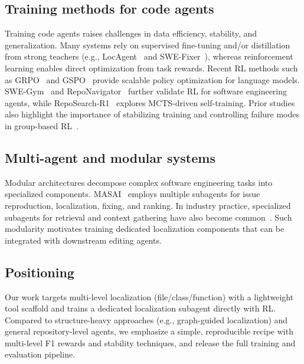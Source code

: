 \subsection{Training methods for code agents}
Training code agents raises challenges in data efficiency, stability, and generalization. Many systems rely on supervised fine-tuning and/or distillation from strong teachers (e.g., LocAgent~\citep{chen-etal-2025-locagent} and SWE-Fixer~\citep{xie2025swefixertrainingopensourcellms}), whereas reinforcement learning enables direct optimization from task rewards. Recent RL methods such as GRPO~\citep{shao2024deepseekmathpushinglimitsmathematical} and GSPO~\citep{zheng2025groupsequencepolicyoptimization} provide scalable policy optimization for language models. SWE-Gym~\citep{pan2025trainingsoftwareengineeringagents} and RepoNavigator~\citep{zhang2026toolenoughreinforcementlearning} further validate RL for software engineering agents, while RepoSearch-R1~\citep{li2025empoweringrepoqaagentbasedreinforcement} explores MCTS-driven self-training. Prior studies also highlight the importance of stabilizing training and controlling failure modes in group-based RL~\citep{sid2025preview}.


\subsection{Multi-agent and modular systems}
Modular architectures decompose complex software engineering tasks into specialized components. MASAI~\citep{arora2024masaimodulararchitecturesoftwareengineering} employs multiple subagents for issue reproduction, localization, fixing, and ranking. In industry practice, specialized subagents for retrieval and context gathering have also become common~\citep{cognition2025swegrep,morph2025warpgrep,cherny2025claudecode,cursor2025semsearch}. Such modularity motivates training dedicated localization components that can be integrated with downstream editing agents.

\subsection{Positioning}
Our work targets multi-level localization (file/class/function) with a lightweight tool scaffold and trains a dedicated localization subagent directly with RL. Compared to structure-heavy approaches (e.g., graph-guided localization) and general repository-level agents, we emphasize a simple, reproducible recipe with multi-level F1 rewards and stability techniques, and release the full training and evaluation pipeline.
